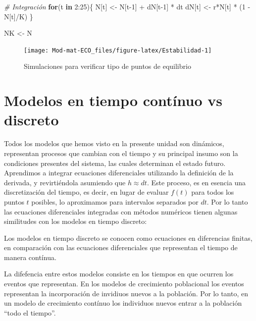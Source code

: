 \documentclass[
]{book}
\newenvironment{Shaded}{\begin{snugshade}}{\end{snugshade}}
\newcommand{\CommentTok}[1]{\textcolor[rgb]{0.56,0.35,0.01}{\textit{#1}}}
\newcommand{\ControlFlowTok}[1]{\textcolor[rgb]{0.13,0.29,0.53}{\textbf{#1}}}
\newcommand{\DecValTok}[1]{\textcolor[rgb]{0.00,0.00,0.81}{#1}}
\newcommand{\NormalTok}[1]{#1}
\newcommand{\OtherTok}[1]{\textcolor[rgb]{0.56,0.35,0.01}{#1}}
\newcommand{\SpecialCharTok}[1]{\textcolor[rgb]{0.00,0.00,0.00}{#1}}
\begin{document}
\begin{Shaded}
\begin{Highlighting}[]
\CommentTok{\# Integración}
\ControlFlowTok{for}\NormalTok{(t }\ControlFlowTok{in} \DecValTok{2}\SpecialCharTok{:}\DecValTok{25}\NormalTok{)\{}
\NormalTok{    N[t] }\OtherTok{\textless{}{-}}\NormalTok{ N[t}\DecValTok{{-}1}\NormalTok{] }\SpecialCharTok{+}\NormalTok{ dN[t}\DecValTok{{-}1}\NormalTok{] }\SpecialCharTok{*}\NormalTok{ dt}
\NormalTok{    dN[t] }\OtherTok{\textless{}{-}}\NormalTok{ r}\SpecialCharTok{*}\NormalTok{N[t] }\SpecialCharTok{*}\NormalTok{ (}\DecValTok{1} \SpecialCharTok{{-}}\NormalTok{ N[t]}\SpecialCharTok{/}\NormalTok{K)}
\NormalTok{\}}

\NormalTok{NK }\OtherTok{\textless{}{-}}\NormalTok{ N}
\end{Highlighting}
\end{Shaded}

\begin{figure}

{\centering \texttt{[image: Mod-mat-ECO\_files/figure-latex/Estabilidad-1]} 

}

\caption{Simulaciones para verificar tipo de puntos de equilibrio}\label{fig:Estabilidad}
\end{figure}

\hypertarget{modelos-en-tiempo-contuxednuo-vs-discreto}{%
\section{Modelos en tiempo contínuo vs discreto}\label{modelos-en-tiempo-contuxednuo-vs-discreto}}

Todos los modelos que hemos visto en la presente unidad son dinámicos, representan procesos que cambian con el tiempo y su principal insumo son la condiciones presentes del sistema, las cuales determinan el estado futuro. Aprendimos a integrar ecuaciones diferenciales utilizando la definición de la derivada, y revirtiéndola asumiendo que \(h \approx dt\). Este proceso, es en esencia una discretización del tiempo, es decir, en lugar de evaluar \(f(t)\) para todos los puntos \(t\) posibles, lo aproximamos para intervalos separados por \(dt\). Por lo tanto las ecuaciones diferenciales integradas con métodos numéricos tienen algunas similitudes con los modelos en tiempo discreto:

Los modelos en tiempo discreto se conocen como ecuaciones en diferencias finitas, en comparación con las ecuaciones diferenciales que representan el tiempo de manera contínua.

La difefencia entre estos modelos consiste en los tiempos en que ocurren los eventos que representan. En los modelos de crecimiento poblacional los eventos representan la incorporación de invidiuos nuevos a la población. Por lo tanto, en un modelo de crecimiento contínuo los individuos nuevos entrar a la población ``todo el tiempo''.
\end{document}
